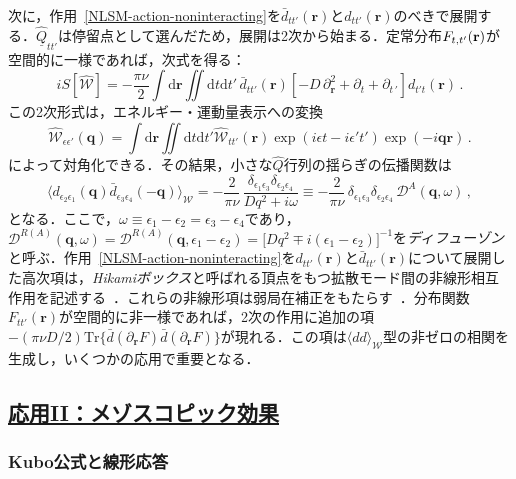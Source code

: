 \documentclass[a4paper,11pt]{ltjsarticle}
\newcommand{\subsectionlink}[1]{\subsection[#1]{\hyperlink{toc}{#1}}}
\def\Tr{\mathrm{Tr}}
\def\d{\mathrm{d}}
\begin{document}
次に，作用~\eqref{NLSM-action-noninteracting}を$\bar{d}_{tt'}(\mathbf{r})$と$d_{tt'}(\mathbf{r})$のべきで展開する．$\underline{\hat{Q}}_{tt'}$は停留点として選んだため，展開は2次から始まる．定常分布$F_{t,t'}({\bf r})$が空間的に一様であれば，次式を得る：
\begin{equation}\label{NLSM-S-W}
iS[\hat{\mathcal{W}}]=-\frac{\pi\nu}{2}\int\d\mathbf{r} \iint\d t\d t'\,
\bar{d}_{tt'}(\mathbf{r})
\left[-D\,\partial^{2}_{\mathbf{r}}+\partial_{t}+\partial_{t\,'}\right]
d_{t't}(\mathbf{r})\,.
\end{equation}
この2次形式は，エネルギー・運動量表示への変換
$$\hat{\mathcal{W}}_{\epsilon\epsilon'}(\mathbf{q})=\int\d\mathbf{r}
\iint\d t\d t'\hat{\mathcal{W}}_{tt'}(\mathbf{r})\exp(i\epsilon
t-i\epsilon't')\exp(-i\mathbf{qr})\,.$$
によって対角化できる．その結果，小さな$\hat Q$行列の揺らぎの伝播関数は
\begin{equation}\label{NLSM-d-d}
\langle d_{\epsilon_{2}\epsilon_{1}}(\mathbf{q})
\bar{d}_{\epsilon_{3}\epsilon_{4}}(-\mathbf{q})\rangle_{\mathcal{W}}=
-\frac{2}{\pi\nu}\,\frac{\delta_{\epsilon_{1}\epsilon_{3}}\delta_{\epsilon_{2}\epsilon_{4}}}
{Dq^2+i\omega}\equiv -\frac{2}{\pi\nu}\,
\delta_{\epsilon_{1}\epsilon_{3}}\delta_{\epsilon_{2}\epsilon_{4}}\,
\mathcal{D}^A(\mathbf{q},\omega)\,,
\end{equation}
となる．ここで，$\omega\equiv\epsilon_{1}-\epsilon_{2}=\epsilon_3-\epsilon_4$であり，$\mathcal{D}^{R(A)}(\mathbf{q},\omega)=\mathcal{D}^{R(A)}(\mathbf{q},\epsilon_{1}-\epsilon_{2})=
\big[Dq^{2}\mp i(\epsilon_{1}-\epsilon_{2})\big]^{-1}$を{\em ディフューゾン}と呼ぶ．作用~\eqref{NLSM-action-noninteracting}を$d_{tt'}(\mathbf{r})$と$\bar{d}_{tt'}(\mathbf{r})$について展開した高次項は，{\em Hikamiボックス}と呼ばれる頂点をもつ拡散モード間の非線形相互作用を記述する~\cite{Hikami:1981zz,Gor'kovLarkinKhmelnitskii}．これらの非線形項は弱局在補正をもたらす~\cite{Gor'kovLarkinKhmelnitskii,AAKL,Lee:1985zzc,ALW-book}．分布関数$F_{tt'}(\mathbf{r})$が空間的に非一様であれば，2次の作用に追加の項$-(\pi\nu D/2)\Tr\big\{\bar{d}(\partial_{\mathbf{r}}
F)\bar{d}(\partial_{\mathbf{r}} F)\big\}$が現れる．この項は$\langle
dd\rangle_{\mathcal{W}}$型の非ゼロの相関を生成し，いくつかの応用で重要となる．




\subsectionlink{応用II：メゾスコピック効果}\label{app_Part-II}
\subsubsection{Kubo公式と線形応答}\label{app_Part-II-1}
\end{document}
